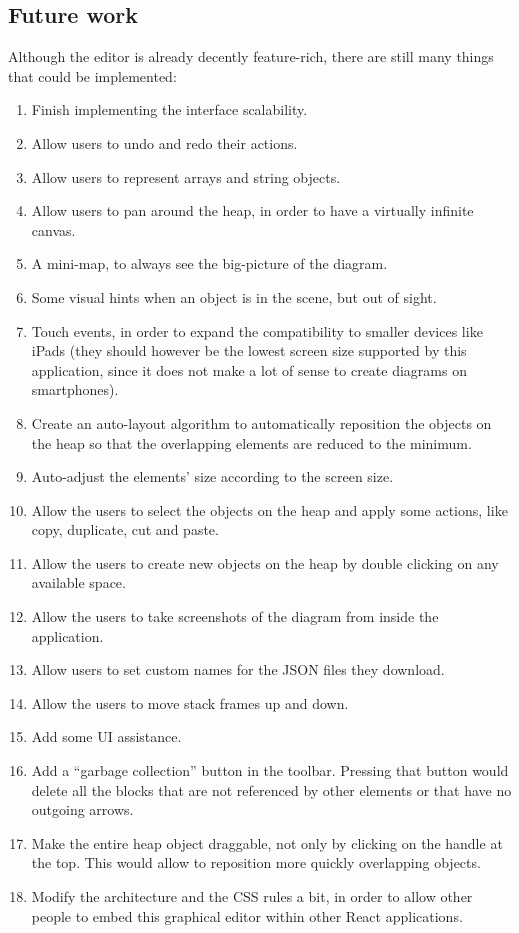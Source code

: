 \documentclass[]{usiinfbachelorproject}
\begin{document}
\subsection{Future work} \label{future work}

Although the editor is already decently feature-rich, there are still many things that could be implemented:

\begin{enumerate}
	\item Finish implementing the interface scalability.
	\item Allow users to undo and redo their actions.
	\item Allow users to represent arrays and string objects.
	\item Allow users to pan around the heap, in order to have a virtually infinite canvas.
	\item A mini-map, to always see the big-picture of the diagram.
	\item Some visual hints when an object is in the scene, but out of sight.
	\item Touch events, in order to expand the compatibility to 	smaller devices like iPads (they should however be the lowest screen size supported by this application, since it does not make a lot of sense to create diagrams on smartphones).
	\item Create an auto-layout algorithm to automatically reposition the objects on the heap so that the overlapping elements are reduced to the minimum.
	\item Auto-adjust the elements' size according to the screen size.
	\item Allow the users to select the objects on the heap and apply some actions, like copy, duplicate, cut and paste.
	\item Allow the users to create new objects on the heap by double clicking on any available space.
	\item Allow the users to take screenshots of the diagram from inside the application.
	\item Allow users to set custom names for the JSON files they download.
	\item Allow the users to move stack frames up and down.
	\item Add some UI assistance.
	\item Add a ``garbage collection'' button in the toolbar. Pressing that button would delete all the blocks that are not referenced by other elements or that have no outgoing arrows.
	\item Make the entire heap object draggable, not only by clicking on the handle at the top. This would allow to reposition more quickly overlapping objects. 
	\item Modify the architecture and the CSS rules a bit, in order to allow other people to embed this graphical editor within other React applications.
\end{enumerate}
\end{document}
